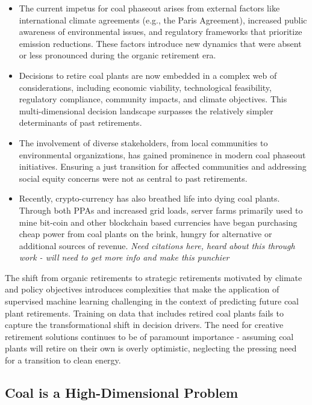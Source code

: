 \documentclass{article}
\begin{document}
\begin{itemize}
    \item The current impetus for coal phaseout arises from external factors like international climate agreements (e.g., the Paris Agreement), increased public awareness of environmental issues, and regulatory frameworks that prioritize emission reductions. These factors introduce new dynamics that were absent or less pronounced during the organic retirement era.
    \item Decisions to retire coal plants are now embedded in a complex web of considerations, including economic viability, technological feasibility, regulatory compliance, community impacts, and climate objectives. This multi-dimensional decision landscape surpasses the relatively simpler determinants of past retirements.
    \item The involvement of diverse stakeholders, from local communities to environmental organizations, has gained prominence in modern coal phaseout initiatives. Ensuring a just transition for affected communities and addressing social equity concerns were not as central to past retirements.
    \item Recently, crypto-currency has also breathed life into dying coal plants. Through both PPAs and increased grid loads, server farms primarily used to mine bit-coin and other blockchain based currencies have began purchasing cheap power from coal plants on the brink, hungry for alternative or additional sources of revenue. \textit{Need citations here, heard about this through work - will need to get more info and make this punchier}
\end{itemize}

The shift from organic retirements to strategic retirements motivated by climate and policy objectives introduces complexities that make the application of supervised machine learning challenging in the context of predicting future coal plant retirements. Training on data that includes retired coal plants fails to capture the transformational shift in decision drivers. The need for creative retirement solutions continues to be of paramount importance - assuming coal plants will retire on their own is overly optimistic, neglecting the pressing need for a transition to clean energy.\\

\subsection{Coal is a High-Dimensional Problem}
\end{document}
